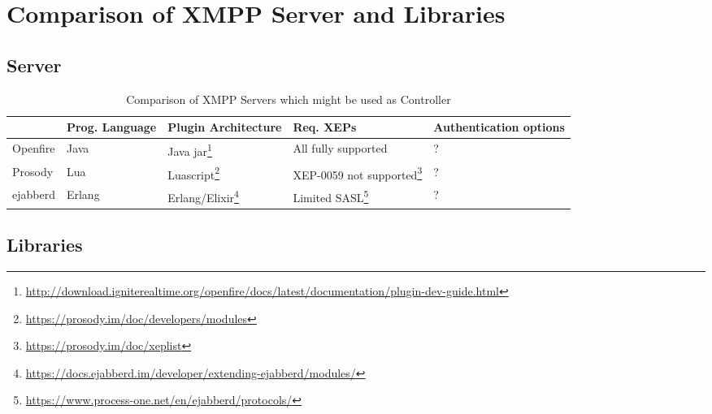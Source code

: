 \section{Comparison of XMPP Server and Libraries}\label{sec:comparison-of-xmpp-server-and-libraries}


\subsection{Server}
\begin{sidewaystable}
    \centering
    \caption{Comparison of XMPP Servers which might be used as Controller}
    \label{tbl:server-comparison}
    \begin{tabu}{X|X X X X}
        \hline
        & Prog. Language
        & Plugin Architecture
        & Req. XEPs
        & Authentication options
        \\ \hline

        Openfire
        & Java
        & Java jar\footnote{\url{http://download.igniterealtime.org/openfire/docs/latest/documentation/plugin-dev-guide.html}}
        & All fully supported
        & ?
        \\

        Prosody
        & Lua
        & Luascript\footnote{\url{https://prosody.im/doc/developers/modules}}
        & XEP-0059 not supported\footnote{\url{https://prosody.im/doc/xeplist}}
        & ?
        \\

        ejabberd
        & Erlang
        & Erlang/Elixir\footnote{\url{https://docs.ejabberd.im/developer/extending-ejabberd/modules/}}
        & Limited SASL\footnote{\url{https://www.process-one.net/en/ejabberd/protocols/}}
        & ?
        \\
    \end{tabu}
\end{sidewaystable}


\subsection{Libraries}

